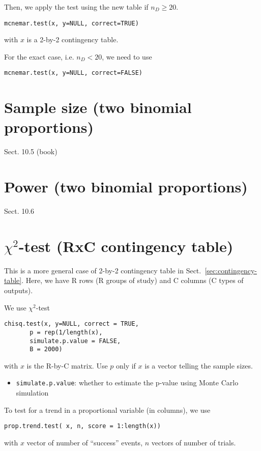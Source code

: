 

Then, we apply the test using the new table if $n_D \ge 20$. 
\begin{lstlisting}
mcnemar.test(x, y=NULL, correct=TRUE)
\end{lstlisting}
with $x$ is a 2-by-2 contingency table. 

For the exact case, i.e. $n_D < 20$, we need to use
\begin{lstlisting}
mcnemar.test(x, y=NULL, correct=FALSE)
\end{lstlisting}

\section{Sample size (two binomial proportions)}
\label{sec:sample-size-two}

Sect. 10.5 (book)

\section{Power (two binomial proportions)}
\label{sec:power-two-binomial}

Sect. 10.6

\section[Chi-square test (RxC contingency table)]{$\chi^2$-test (RxC contingency
table)}
\label{sec:chi2-test-rxc}

This is a more general case of 2-by-2 contingency table in
Sect.~\ref{sec:contingency-table}. Here, we have R rows (R groups of
study) and C columns (C types of outputs). 


We use $\chi^2$-test
\begin{lstlisting}
chisq.test(x, y=NULL, correct = TRUE,
       p = rep(1/length(x), 
       simulate.p.value = FALSE,
       B = 2000)
\end{lstlisting}
with $x$ is the R-by-C matrix. Use $p$ only if $x$ is a vector telling
the sample sizes.
\begin{itemize}
\item \verb!simulate.p.value!: whether to estimate the p-value using
  Monte Carlo simulation
\end{itemize}


To test for a trend in a proportional variable (in columns), we use
\begin{lstlisting}
prop.trend.test( x, n, score = 1:length(x))
\end{lstlisting}
with $x$ vector of number of ``success'' events, $n$ vectors of number
of trials.

